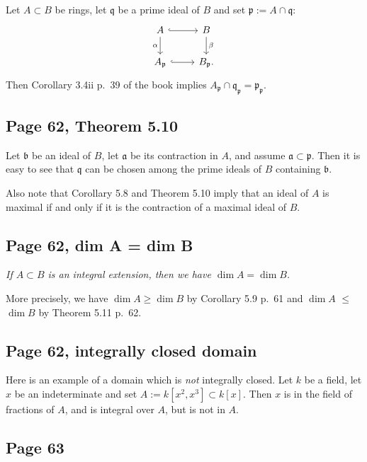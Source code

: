 \documentclass[parskip=half,fontsize=12pt]{scrartcl}%
\newcommand{\mf}{\mathfrak}
\newcommand{\aaa}{\mf a}
\newcommand{\bbb}{\mf b}
\newcommand{\ppp}{\mf p}
\newcommand{\qqq}{\mf q}
\begin{document}
Let $A\subset B$ be rings, let $\qqq$ be a prime ideal of $B$ and set $\ppp:=A\cap\qqq$:
$$
\begin{tikzcd}
A\ar[d,"\alpha"']\ar[r,hook]&B\ar[d,"\beta"]\\ 
A_\ppp\ar[r,hook]&B_\ppp.
\end{tikzcd}
$$
Then Corollary 3.4ii p.~39 of the book implies $A_\ppp\cap\qqq_\ppp=\ppp_\ppp$.

\subsection{Page 62, Theorem 5.10}\label{510}%

Let $\bbb$ be an ideal of $B$, let $\aaa$ be its contraction in $A$, and assume $\aaa\subset\ppp$. Then it is easy to see that $\qqq$ can be chosen among the prime ideals of $B$ containing $\bbb$. 

Also note that Corollary 5.8 and Theorem 5.10 imply that an ideal of $A$ is maximal if and only if it is the contraction of a maximal ideal of $B$. 

\subsection{Page 62, dim A = dim B}%

\emph{If $A\subset B$ is an integral extension, then we have $\dim A=\dim B$.}

More precisely, we have $\dim A\ge\dim B$ by Corollary 5.9 p.~61 and $\dim A$ $\le$ $\dim B$ by Theorem 5.11 p.~62.

\subsection{Page 62, integrally closed domain}%

Here is an example of a domain which is \emph{not} integrally closed. Let $k$ be a field, let $x$ be an indeterminate and set $A:=k[x^2,x^3]\subset k[x]$. Then $x$ is in the field of fractions of $A$, and is integral over $A$, but is not in $A$.

\subsection{Page 63}%
\end{document}
